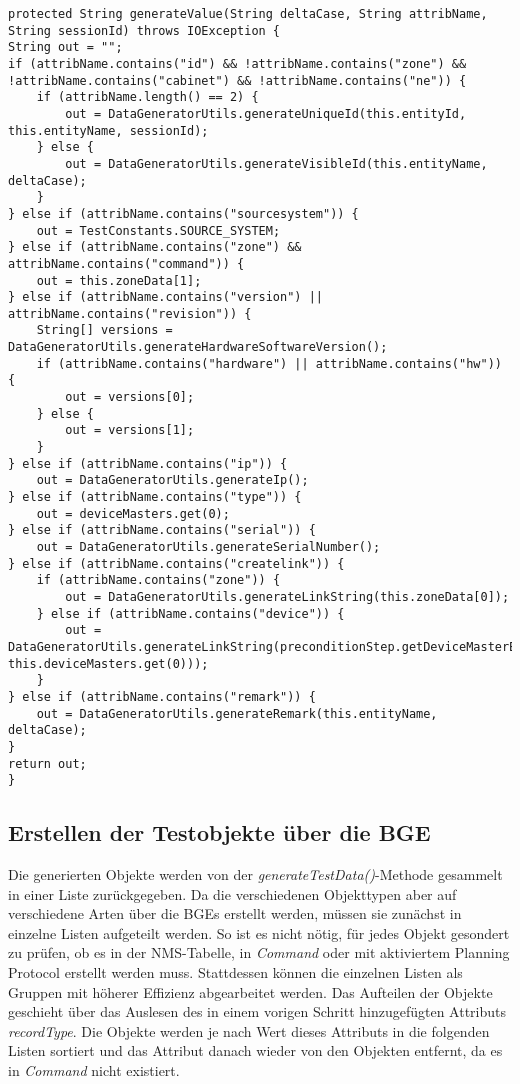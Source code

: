 \newpage
\begin{lstlisting}[caption=Methode zur Wertegenerierung, label=generateValue,style=Javastyle,basicstyle=\fontsize{10}{11}\ttfamily]
protected String generateValue(String deltaCase, String attribName, String sessionId) throws IOException {
String out = "";
if (attribName.contains("id") && !attribName.contains("zone") && !attribName.contains("cabinet") && !attribName.contains("ne")) {
    if (attribName.length() == 2) {
        out = DataGeneratorUtils.generateUniqueId(this.entityId, this.entityName, sessionId);
    } else {
        out = DataGeneratorUtils.generateVisibleId(this.entityName, deltaCase);
    }
} else if (attribName.contains("sourcesystem")) {
    out = TestConstants.SOURCE_SYSTEM;
} else if (attribName.contains("zone") && attribName.contains("command")) {
    out = this.zoneData[1];
} else if (attribName.contains("version") || attribName.contains("revision")) {
    String[] versions = DataGeneratorUtils.generateHardwareSoftwareVersion();
    if (attribName.contains("hardware") || attribName.contains("hw")) {
        out = versions[0];
    } else {
        out = versions[1];
    }
} else if (attribName.contains("ip")) {
    out = DataGeneratorUtils.generateIp();
} else if (attribName.contains("type")) {
    out = deviceMasters.get(0);
} else if (attribName.contains("serial")) {
    out = DataGeneratorUtils.generateSerialNumber();
} else if (attribName.contains("createlink")) {
    if (attribName.contains("zone")) {
        out = DataGeneratorUtils.generateLinkString(this.zoneData[0]);
    } else if (attribName.contains("device")) {
        out = DataGeneratorUtils.generateLinkString(preconditionStep.getDeviceMasterElid(sessionId, this.deviceMasters.get(0)));
    }
} else if (attribName.contains("remark")) {
    out = DataGeneratorUtils.generateRemark(this.entityName, deltaCase);
}
return out;
}
\end{lstlisting}

\subsection{Erstellen der Testobjekte über die BGE}\label{subsec:creatingObjectsBGE}
Die generierten Objekte werden von der \textit{generateTestData()}-Methode gesammelt in einer Liste zurückgegeben. 
Da die verschiedenen Objekttypen aber auf verschiedene Arten über die \ac{BGE}s erstellt werden, müssen sie zunächst in einzelne Listen aufgeteilt werden. So ist es nicht nötig, für jedes Objekt gesondert zu prüfen, ob es in der \ac{NMS}-Tabelle, in \textit{Command} oder mit aktiviertem Planning Protocol erstellt werden muss. Stattdessen können die einzelnen Listen als Gruppen mit höherer Effizienz abgearbeitet werden. Das Aufteilen der Objekte geschieht über das Auslesen des in einem vorigen Schritt hinzugefügten Attributs \textit{recordType}. Die Objekte werden je nach Wert dieses Attributs in die folgenden Listen sortiert und das Attribut danach wieder von den Objekten entfernt, da es in \textit{Command} nicht existiert.

